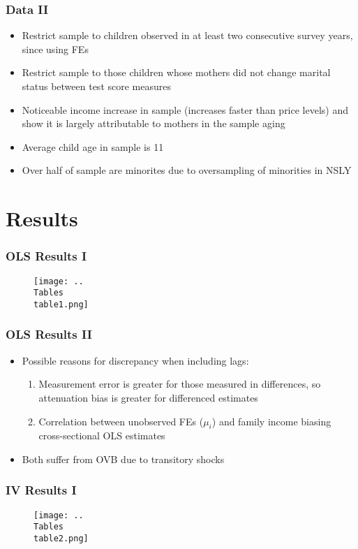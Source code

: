 \documentclass{beamer}
\begin{document}
\begin{frame}
\frametitle{Data II}
\begin{itemize}
	\item Restrict sample to children observed in at least two consecutive survey years, since using FEs
	\item Restrict sample to those children whose mothers did not change marital status between test score measures
	\item Noticeable income increase in sample (increases faster than price levels) and show it is largely attributable to mothers in the sample aging
	\item Average child age in sample is 11
	\item Over half of sample are minorites due to oversampling of minorities in NSLY
\end{itemize}
\end{frame}


\section{Results}


\begin{frame}
\frametitle{OLS Results I}
	\begin{figure}
		\texttt{[image: ..\\Tables\\table1.png]} %
	\end{figure}
\end{frame}

\begin{frame}
\frametitle{OLS Results II}
	\begin{itemize}
		\item Possible reasons for discrepancy when including lags:
		\begin{enumerate}[(1)]
			\item Measurement error is greater for those measured in differences, so attenuation bias is greater for differenced estimates
			\item Correlation between unobserved FEs ($\mu_i$) and family income biasing cross-sectional OLS estimates 
		\end{enumerate}
		\item Both suffer from OVB due to transitory shocks
	\end{itemize}
\end{frame}

\begin{frame}
\frametitle{IV Results I}
	\begin{figure}
		\texttt{[image: ..\\Tables\\table2.png]}
	\end{figure}
\end{frame}
\end{document}
